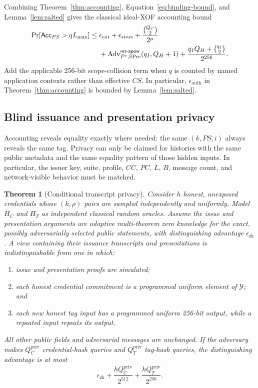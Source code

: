 \documentclass[11pt]{article}
\newcommand{\Adv}{\operatorname{Adv}}
\newtheorem{theorem}{Theorem}
\theoremstyle{remark}
\begin{document}
Combining Theorem~\ref{thm:accounting},
Equation~\eqref{eq:binding-bound}, and Lemma~\ref{lem:salted} gives the
classical ideal-XOF accounting bound
\begin{align}
\Pr[\mathsf{Acc}_{PS}>qL_{\max}]
\leq{}&
 \epsilon_{\mathrm{ext}}+\epsilon_{\mathrm{store}}
 + \frac{\binom{Q_C}{2}}{2^\mu} \notag\\
&+
 \Adv^{\mathsf{mt\text{-}apow}}_{P^*,\mathrm{SPre}}(q_I,Q_H+1)
 + \frac{q_I Q_H+\binom{q_I}{2}}{2^{256}}.
\label{eq:combined-bound}
\end{align}
Add the applicable 256-bit scope-collision term when $q$ is counted by named
application contexts rather than effective $CS$. In particular,
$\epsilon_{\mathrm{auth}}$ in Theorem~\ref{thm:accounting} is bounded by
Lemma~\ref{lem:salted}.

\subsection{Blind issuance and presentation privacy}

Accounting reveals equality exactly where needed: the same
$(k,PS,i)$ always reveals the same tag. Privacy can only be claimed for
histories with the same public metadata and the same equality pattern of
those hidden inputs. In particular, the issuer key, suite, profile, $CC$,
$PC$, $L$, $B$, message count, and network-visible behavior must be matched.

\begin{theorem}[Conditional transcript privacy]
\label{thm:privacy}
Consider $h$ honest, unexposed credentials whose $(k,\rho)$ pairs are sampled
independently and uniformly. Model $H_C$ and $H_T$ as independent classical
random oracles. Assume the issue and presentation arguments are adaptive
multi-theorem zero knowledge for the exact, possibly adversarially selected
public statements, with distinguishing advantage
$\epsilon_{\mathrm{zk}}$. A view containing their issuance transcripts and
presentations is indistinguishable from one in which:
\begin{enumerate}
  \item issue and presentation proofs are simulated;
  \item each honest credential commitment is a programmed uniform element of
        $\mathcal{Y}$; and
  \item each new honest tag input has a programmed uniform 256-bit output,
        while a repeated input repeats its output.
\end{enumerate}
All other public fields and adversarial messages are unchanged.
If the adversary makes $Q_C^{\mathrm{priv}}$ credential-hash queries and
$Q_T^{\mathrm{priv}}$ tag-hash queries, the distinguishing advantage is at
most
\begin{equation}
\label{eq:privacy-bound}
 \epsilon_{\mathrm{zk}}
 + \frac{hQ_C^{\mathrm{priv}}}{2^{512}}
 + \frac{hQ_T^{\mathrm{priv}}}{2^{256}}.
\end{equation}
\end{theorem}
\end{document}
